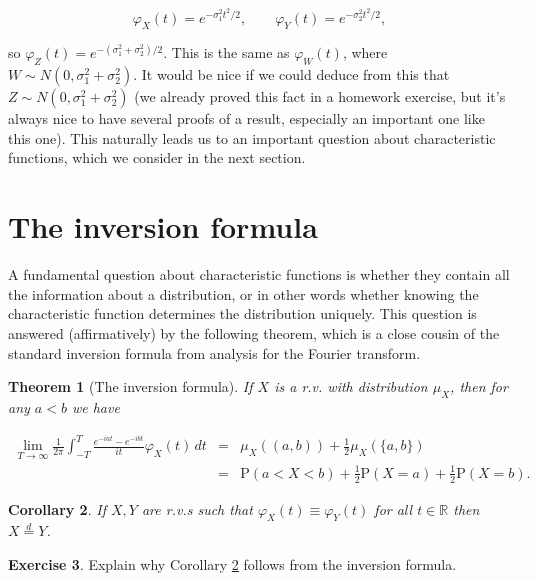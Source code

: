 \documentclass[11pt]{report}
\newcommand{\R}{\mathbb{R}}
\theoremstyle{plain}
\newtheorem{thm}{Theorem}[chapter]
\newtheorem{cor}[thm]{Corollary}
\theoremstyle{definition}
\newtheorem{xexercise}[thm]{Exercise}
\begin{document}
\[
\varphi_X(t) = e^{-\sigma_1^2 t^2/2}, \qquad \varphi_Y(t) = e^{-\sigma_2^2 t^2/2},
\]

so $\varphi_Z(t) = e^{-(\sigma_1^2+\sigma_2^2)/2}$.
This is the same as $\varphi_W(t)$, where
$W\sim N(0,\sigma_1^2+\sigma_2^2)$. It would be nice
if we could deduce from this that
$Z \sim N(0,\sigma_1^2+\sigma_2^2)$ (we already
proved this fact in a homework exercise, but it's
always nice to have several proofs of a result,
especially an important one like this one). This
naturally leads us to an important question about
characteristic functions, which we consider in the
next section.

\section{The inversion formula}
A fundamental question about characteristic functions
is whether they contain all the information about a
distribution, or in other words whether knowing the
characteristic function determines the distribution
uniquely. This question is answered (affirmatively) by
the following theorem, which is a close cousin of the
standard inversion formula from analysis for the
Fourier transform.

\begin{thm}[The inversion formula]
\label{thm-inversion}
If $X$ is a r.v. with distribution $\mu_X$, then for
any $a<b$ we have

\begin{eqnarray*} \lim_{T\to\infty} \frac{1}{2\pi} \int_{-T}^T \frac{e^{-iat}-e^{-ibt}}{it}\varphi_X(t)\,dt &=& \mu_X((a,b)) + \frac12
\mu_X(\{a,b\}) \\ &=& \mathrm{P}(a<X<b) + \frac12 \mathrm{P}(X=a)+\frac12 \mathrm{P}(X=b).
\end{eqnarray*}

\end{thm}

\begin{cor}
\label{cor:charfun-uniqueness}
If $X,Y$ are r.v.s such that
$\varphi_X(t)\equiv \varphi_Y(t)$ for all $t\in\R$
then $X \stackrel{d}{=} Y$.
\end{cor}

\begin{xexercise}
Explain why Corollary \ref{cor:charfun-uniqueness}
follows from the inversion formula.
\end{xexercise}
\end{document}
